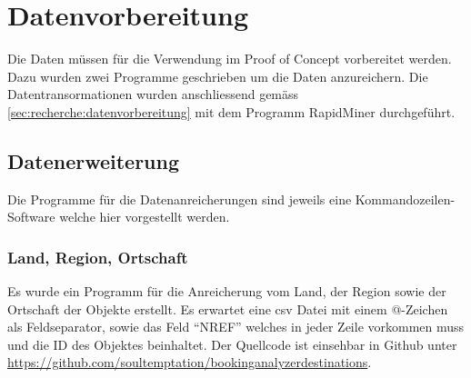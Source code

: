 

\section{Datenvorbereitung}
\label{sec:proofofconcept:datenvorbereitung}


Die Daten müssen für die Verwendung im Proof of Concept vorbereitet werden. Dazu wurden zwei Programme geschrieben um die Daten anzureichern. Die Datentransormationen wurden anschliessend gemäss \cref{sec:recherche:datenvorbereitung} mit dem Programm RapidMiner durchgeführt.

\subsection{Datenerweiterung}
\label{sec:proofofconcept:datenvorbereitung:datenerweiterung}
Die Programme für die Datenanreicherungen sind jeweils eine Kommandozeilen-Software welche hier vorgestellt werden.

\subsubsection{Land, Region, Ortschaft}
\label{sec:proofofconcept:datenvorbereitung:datenerweiterung:landregionortschaft}
Es wurde ein Programm für die Anreicherung vom Land, der Region sowie der Ortschaft der Objekte erstellt. Es erwartet eine \gls{csv} Datei mit einem @-Zeichen als Feldseparator, sowie das Feld "`NREF"' welches in jeder Zeile vorkommen muss und die ID des Objektes beinhaltet. Der Quellcode ist einsehbar in Github unter \url{https://github.com/soultemptation/bookinganalyzerdestinations}.

